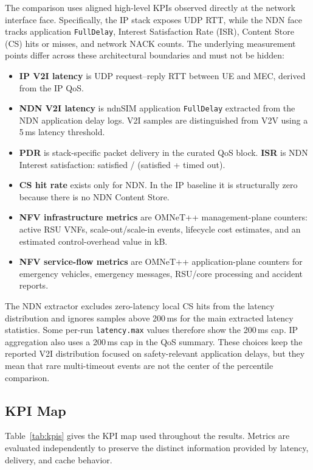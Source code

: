 \documentclass[journal]{IEEEtran}
\newcommand{\code}[1]{\texttt{\small #1}}
\begin{document}
The comparison uses aligned high-level KPIs observed directly at the network interface face. Specifically, the IP stack exposes UDP RTT, while the NDN face tracks application \code{FullDelay}, Interest Satisfaction Rate (ISR), Content Store (CS) hits or misses, and network NACK counts. The underlying measurement points differ across these architectural boundaries and must not be hidden:
\begin{itemize}
  \item \textbf{IP V2I latency} is UDP request--reply RTT between UE and MEC, derived from the IP QoS.
  \item \textbf{NDN V2I latency} is ndnSIM application \code{FullDelay} extracted from the NDN application delay logs. V2I samples are distinguished from V2V using a 5\,ms latency threshold.
  \item \textbf{PDR} is stack-specific packet delivery in the curated QoS block. \textbf{ISR} is NDN Interest satisfaction: satisfied / (satisfied + timed out).
  \item \textbf{CS hit rate} exists only for NDN. In the IP baseline it is structurally zero because there is no NDN Content Store.
  \item \textbf{NFV infrastructure metrics} are OMNeT++ management-plane counters: active RSU VNFs, scale-out/scale-in events, lifecycle cost estimates, and an estimated control-overhead value in kB.
  \item \textbf{NFV service-flow metrics} are OMNeT++ application-plane counters for emergency vehicles, emergency messages, RSU/core processing and accident reports.
\end{itemize}

The NDN extractor excludes zero-latency local CS hits from the latency distribution and ignores samples above 200\,ms for the main extracted latency statistics. Some per-run \code{latency.max} values therefore show the 200\,ms cap. IP aggregation also uses a 200\,ms cap in the QoS summary. These choices keep the reported V2I distribution focused on safety-relevant application delays, but they mean that rare multi-timeout events are not the center of the percentile comparison.

\subsection{KPI Map}

Table~\ref{tab:kpis} gives the KPI map used throughout the results. Metrics are evaluated independently to preserve the distinct information provided by latency, delivery, and cache behavior.
\end{document}
